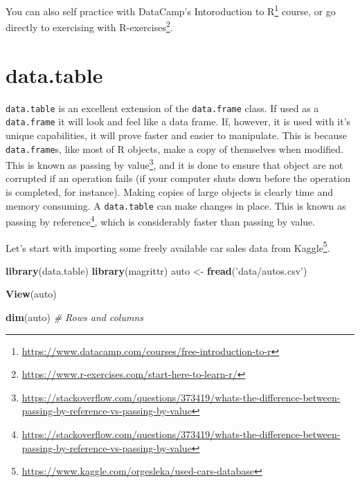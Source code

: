 \documentclass[]{book}
\newenvironment{Shaded}{\begin{snugshade}}{\end{snugshade}}
\newcommand{\CommentTok}[1]{\textcolor[rgb]{0.56,0.35,0.01}{\textit{#1}}}
\newcommand{\KeywordTok}[1]{\textcolor[rgb]{0.13,0.29,0.53}{\textbf{#1}}}
\newcommand{\NormalTok}[1]{#1}
\newcommand{\StringTok}[1]{\textcolor[rgb]{0.31,0.60,0.02}{#1}}
\renewcommand{\href}[2]{#2\footnote{\url{#1}}}
\theoremstyle{definition}
\theoremstyle{definition}
\theoremstyle{definition}
\theoremstyle{remark}
\begin{document}
You can also self practice with DataCamp's \href{https://www.datacamp.com/courses/free-introduction-to-r}{Intoroduction to R} course, or go directly to exercising with \href{https://www.r-exercises.com/start-here-to-learn-r/}{R-exercises}.

\hypertarget{datatable}{%
\chapter{data.table}\label{datatable}}

\texttt{data.table} is an excellent extension of the \texttt{data.frame} class.
If used as a \texttt{data.frame} it will look and feel like a data frame.
If, however, it is used with it's unique capabilities, it will prove faster and easier to manipulate.
This is because \texttt{data.frame}s, like most of R objects, make a copy of themselves when modified.
This is known as \href{https://stackoverflow.com/questions/373419/whats-the-difference-between-passing-by-reference-vs-passing-by-value}{passing by value}, and it is done to ensure that object are not corrupted if an operation fails (if your computer shuts down before the operation is completed, for instance).
Making copies of large objects is clearly time and memory consuming.
A \texttt{data.table} can make changes in place.
This is known as \href{https://stackoverflow.com/questions/373419/whats-the-difference-between-passing-by-reference-vs-passing-by-value}{passing by reference}, which is considerably faster than passing by value.

Let's start with importing some freely available car sales data from \href{https://www.kaggle.com/orgesleka/used-cars-database}{Kaggle}.

\begin{Shaded}
\begin{Highlighting}[]
\KeywordTok{library}\NormalTok{(data.table)}
\KeywordTok{library}\NormalTok{(magrittr)}
\NormalTok{auto <-}\StringTok{ }\KeywordTok{fread}\NormalTok{(}\StringTok{'data/autos.csv'}\NormalTok{)}
\end{Highlighting}
\end{Shaded}

\begin{Shaded}
\begin{Highlighting}[]
\KeywordTok{View}\NormalTok{(auto)}
\end{Highlighting}
\end{Shaded}

\begin{Shaded}
\begin{Highlighting}[]
\KeywordTok{dim}\NormalTok{(auto) }\CommentTok{#  Rows and columns}
\end{Highlighting}
\end{Shaded}
\end{document}
